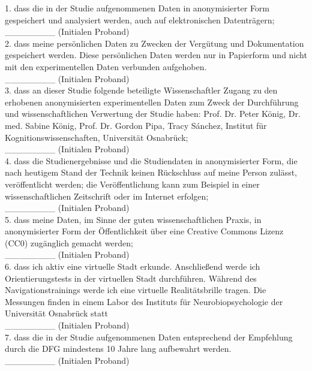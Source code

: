 1.     dass die in der Studie aufgenommenen Daten in anonymisierter Form gespeichert und analysiert werden, auch auf elektronischen Datenträgern; \\
\_\_\_\_\_\_\_\_ (Initialen Proband) \\

2.     dass meine persönlichen Daten zu Zwecken der Vergütung und Dokumentation gespeichert werden. Diese persönlichen Daten werden nur in Papierform und nicht mit den experimentellen Daten verbunden aufgehoben. \\
\_\_\_\_\_\_\_\_ (Initialen Proband) \\

3.     dass an dieser Studie folgende beteiligte Wissenschaftler Zugang zu den erhobenen anonymisierten experimentellen Daten zum Zweck der Durchführung und wissenschaftlichen Verwertung der Studie haben: Prof. Dr. Peter König, Dr. med. Sabine König, Prof. Dr. Gordon Pipa, Tracy Sánchez, Institut für Kognitionswissenschaften, Universität Osnabrück;  \\
\_\_\_\_\_\_\_\_ (Initialen Proband) \\

4.     dass die Studienergebnisse und die Studiendaten in anonymisierter Form, die nach heutigem Stand der Technik keinen Rückschluss auf meine Person zulässt, veröffentlicht werden; die Veröffentlichung kann zum Beispiel in einer wissenschaftlichen Zeitschrift oder im Internet erfolgen;  \\
\_\_\_\_\_\_\_\_ (Initialen Proband) \\

5.     dass meine Daten, im Sinne der guten wissenschaftlichen Praxis, in anonymisierter Form der Öffentlichkeit über eine Creative Commons Lizenz (CC0) zugänglich gemacht werden;  \\
\_\_\_\_\_\_\_\_ (Initialen Proband) \\

6.     dass ich aktiv eine virtuelle Stadt erkunde. Anschließend werde ich Orientierungstests in der virtuellen Stadt durchführen. Während des Navigationstrainings werde ich eine virtuelle Realitätsbrille tragen. Die Messungen finden in einem Labor des Instituts für Neurobiopsychologie der Universität Osnabrück statt  \\
\_\_\_\_\_\_\_\_ (Initialen Proband) \\

7. dass die in der Studie aufgenommenen Daten entsprechend der Empfehlung durch die DFG mindestens 10 Jahre lang aufbewahrt werden. \\
\_\_\_\_\_\_\_\_ (Initialen Proband) \\

